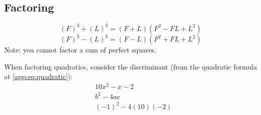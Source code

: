 \subsection{Factoring}

\begin{equation}
  (F)^3+(L)^3=(F+L)(F^2-FL+L^2)
\end{equation}
\begin{equation}
  (F)^3-(L)^3=(F-L)(F^2+FL+L^2)
\end{equation}
Note: you cannot factor a sum of perfect squares.
\begin{remark} When factoring quadratics, consider the discriminant (from the quadratic formula at \ref{app:eq:quadratic}):
  \begin{align*}
    &10x^2-x-2 \\
    &b^2-4ac \\
    &(-1)^2-4(10)(-2)
  \end{align*}
\end{remark}

%


